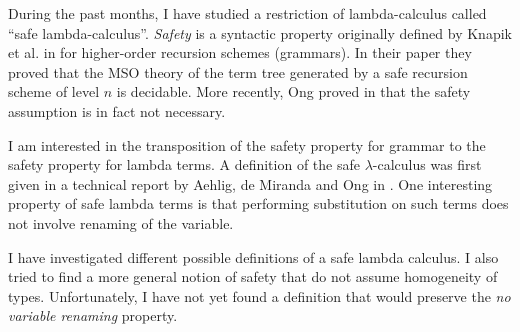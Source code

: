 %


%
%

During the past months, I have studied a restriction of
lambda-calculus called ``safe lambda-calculus''. \emph{Safety} is a
syntactic property originally defined by Knapik et al. in
\cite{KNU02} for higher-order recursion schemes (grammars). In their
paper they proved that the MSO theory of the term tree generated by
a safe recursion scheme of level $n$ is decidable. More recently,
Ong proved in \cite{OngLics2006} that the safety assumption is in
fact not necessary.

I am interested in the transposition of the safety property for
grammar to the safety property for lambda terms. A definition of the
safe $\lambda$-calculus was first given in a technical report by
Aehlig, de Miranda and Ong in \cite{safety-mirlong2004}. One
interesting property of safe lambda terms is that performing
substitution on such terms does not involve renaming of the
variable.

I have investigated different possible definitions of a safe lambda
calculus. I also tried to find a more general notion of safety that
do not assume homogeneity of types. Unfortunately, I have not yet
found a definition that would preserve the \emph{no variable
renaming} property.

